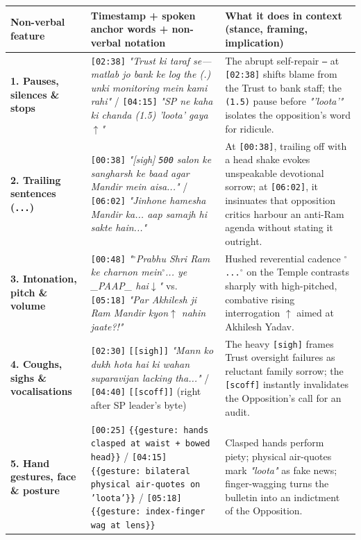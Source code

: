 \documentclass[10pt,a4paper]{article}
\begin{document}
\begin{longtable}{|p{}|p{}|p{}|}
\hline
Non-verbal feature & Timestamp + spoken anchor words + non-verbal notation & What it does in context (stance, framing, implication) \\ \hline \endhead
\textbf{1. Pauses, silences \& stops} & \texttt{[02:38]} \textit{"Trust ki taraf se--- matlab jo bank ke log the (.) unki monitoring mein kami rahi"} / \texttt{[04:15]} \textit{"SP ne kaha ki chanda (1.5) 'loota' gaya$\uparrow$"} & The abrupt self-repair \texttt{---} at \texttt{[02:38]} shifts blame from the Trust to bank staff; the \texttt{(1.5)} pause before \textit{"'loota'"} isolates the opposition's word for ridicule. \\ \hline
\textbf{2. Trailing sentences (\texttt{...})} & \texttt{[00:38]} \textit{"[sigh] \texttt{500} salon ke sangharsh ke baad agar Mandir mein aisa..."} / \texttt{[06:02]} \textit{"Jinhone hamesha Mandir ka... aap samajh hi sakte hain..."} & At \texttt{[00:38]}, trailing off with a head shake evokes unspeakable devotional sorrow; at \texttt{[06:02]}, it insinuates that opposition critics harbour an anti-Ram agenda without stating it outright. \\ \hline
\textbf{3. Intonation, pitch \& volume} & \texttt{[00:48]} \textit{"$^\circ$Prabhu Shri Ram ke charnon mein$^\circ$... ye \_PAAP\_ hai$\downarrow$"} vs. \texttt{[05:18]} \textit{"Par Akhilesh ji Ram Mandir kyon$\uparrow$ nahin jaate?!"} & Hushed reverential cadence \texttt{$^\circ$...$^\circ$} on the Temple contrasts sharply with high-pitched, combative rising interrogation \texttt{$\uparrow$} aimed at Akhilesh Yadav. \\ \hline
\textbf{4. Coughs, sighs \& vocalisations} & \texttt{[02:30]} \texttt{[[sigh]]} \textit{"Mann ko dukh hota hai ki wahan suparavijan lacking tha..."} / \texttt{[04:40]} \texttt{[[scoff]]} (right after SP leader's byte) & The heavy \texttt{[sigh]} frames Trust oversight failures as reluctant family sorrow; the \texttt{[scoff]} instantly invalidates the Opposition's call for an audit. \\ \hline
\textbf{5. Hand gestures, face \& posture} & \texttt{[00:25]} \texttt{\{\{gesture: hands clasped at waist + bowed head\}\}} / \texttt{[04:15]} \texttt{\{\{gesture: bilateral physical air-quotes on 'loota'\}\}} / \texttt{[05:18]} \texttt{\{\{gesture: index-finger wag at lens\}\}} & Clasped hands perform piety; physical air-quotes mark \textit{"loota"} as fake news; finger-wagging turns the bulletin into an indictment of the Opposition. \\ \hline
\end{longtable}
\end{document}
